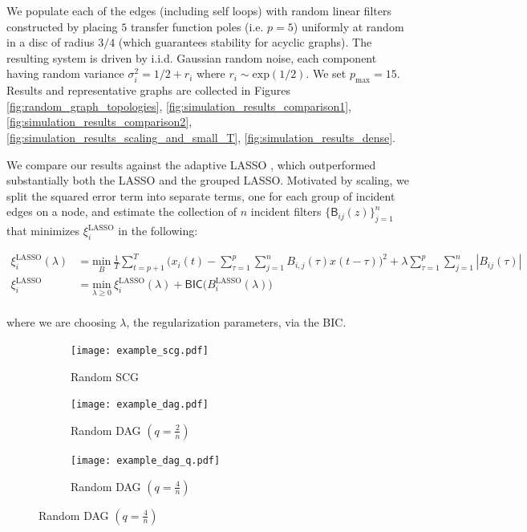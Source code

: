 \documentclass[12pt]{article}
\def\B{\mathsf{B}}  %
\begin{document}
We populate each of the edges (including self loops) with random
linear filters constructed by placing $5$ transfer function poles
(i.e. $p = 5$) uniformly at random in a disc of radius $3 / 4$ (which
guarantees stability for acyclic graphs).  The resulting system is
driven by i.i.d. Gaussian random noise, each component having random
variance $\sigma_i^2 = 1/2 + r_i$ where $r_i \sim \text{exp}(1/2)$.
We set $p_{\text{max}} = 15$.  Results and representative graphs are
collected in Figures \ref{fig:random_graph_topologies},
\ref{fig:simulation_results_comparison1},
\ref{fig:simulation_results_comparison2},
\ref{fig:simulation_results_scaling_and_small_T},
\ref{fig:simulation_results_dense}.

We compare our results against the adaptive LASSO
\cite{adaptive_lasso_zou2006}, which outperformed substantially both
the LASSO and the grouped LASSO.  Motivated by scaling, we split the
squared error term into separate terms, one for each group of incident
edges on a node, and estimate the collection of $n$ incident filters
$\big\{\B_{ij}(z)\big\}_{j = 1}^n$ that minimizes
$\xi_i^{\text{LASSO}}$ in the following:

\begin{equation}
  \begin{aligned}
  \xi_i^{\text{LASSO}}(\lambda) &= \underset{B}{\text{min}}\ \frac{1}{T}\sum_{t = p + 1}^T\big(x_i(t) - \sum_{\tau = 1}^p\sum_{j = 1}^n B_{i, j}(\tau) x(t - \tau)\big)^2 + \lambda \sum_{\tau = 1}^p \sum_{j = 1}^n |B_{ij}(\tau)|\\
  \xi_i^{\text{LASSO}} &= \underset{\lambda \ge 0}{\text{min}}\ \xi_i^{\text{LASSO}}(\lambda) + \mathsf{BIC}\big(B_i^{\text{LASSO}}(\lambda)\big)\\
  \end{aligned}
\end{equation}

where we are choosing $\lambda$, the regularization parameters, via the BIC.

\begin{figure}
  \centering
  \caption{Representative Random Graph Topologies}
  \label{fig:random_graph_topologies}
  \begin{subfigure}[b]{0.3\textwidth}
    \caption{Random SCG}
    \texttt{[image: example\_scg.pdf]}
  \end{subfigure}
  \begin{subfigure}[b]{0.3\textwidth}
    \caption{Random DAG $(q = \frac{2}{n})$}
    \texttt{[image: example\_dag.pdf]}
  \end{subfigure}
  \begin{subfigure}[b]{0.3\textwidth}
    \caption{Random DAG $(q = \frac{4}{n})$}
    \texttt{[image: example\_dag\_q.pdf]}
  \end{subfigure}
\end{figure}
\end{document}
